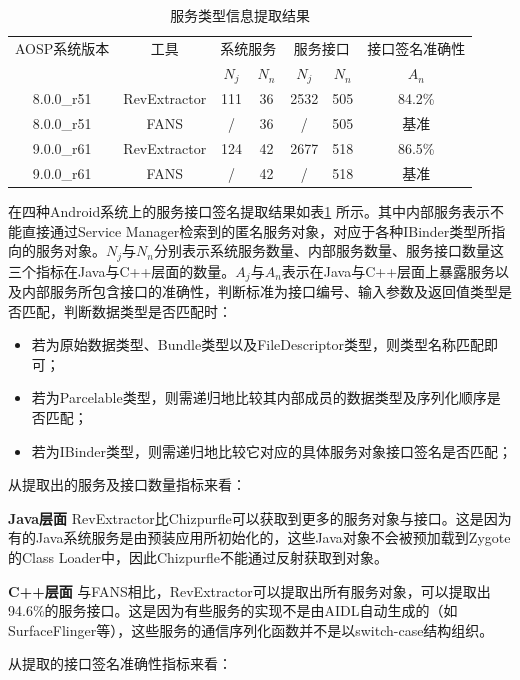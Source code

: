 \documentclass[winfonts,master,twoside]{njuthesis}
\begin{document}
\begin{table}[!htbp]
	\centering
	\begin{tabular}{ccc|cc|cc}
		\toprule{}
		AOSP系统版本 & 工具 & \multicolumn{2}{c}{系统服务} & \multicolumn{2}{c}{服务接口} & 接口签名准确性 \\
		& & $N_j$ & $N_n$ & $N_j$ & $N_n$ & $A_n$\\
		\midrule
		8.0.0\_r51 & RevExtractor & 111& 36 &2532&505 &84.2\%\\
		8.0.0\_r51 & FANS         & /  & 36 & /  &505 &基准   \\
		9.0.0\_r61 & RevExtractor & 124& 42 &2677&518 &86.5\%\\
		9.0.0\_r61 & FANS         & /  & 42 & /  &518 &基准   \\
		\bottomrule
	\end{tabular}
	\caption{服务类型信息提取结果}
	\label{tbl:extractor_comp}
\end{table}
\fi

在四种Android系统上的服务接口签名提取结果如表\ref{tbl:extractor_comp} 所示。其中内部服务表示不能直接通过Service Manager检索到的匿名服务对象，对应于各种IBinder类型所指向的服务对象。$N_j$与$N_n$分别表示系统服务数量、内部服务数量、服务接口数量这三个指标在Java与C++层面的数量。$A_j$与$A_n$表示在Java与C++层面上暴露服务以及内部服务所包含接口的准确性，判断标准为接口编号、输入参数及返回值类型是否匹配，判断数据类型是否匹配时：
\begin{itemize}
	\item 若为原始数据类型、Bundle类型以及FileDescriptor类型，则类型名称匹配即可；
	\item 若为Parcelable类型，则需递归地比较其内部成员的数据类型及序列化顺序是否匹配；
	\item 若为IBinder类型，则需递归地比较它对应的具体服务对象接口签名是否匹配；
\end{itemize}

从提取出的服务及接口数量指标来看：

\textbf{Java层面} \quad RevExtractor比Chizpurfle可以获取到更多的服务对象与接口。这是因为有的Java系统服务是由预装应用所初始化的，这些Java对象不会被预加载到Zygote的Class Loader中，因此Chizpurfle不能通过反射获取到对象。

\textbf{C++层面} \quad 与FANS相比，RevExtractor可以提取出所有服务对象，可以提取出94.6\%的服务接口。这是因为有些服务的实现不是由AIDL自动生成的（如SurfaceFlinger等），这些服务的通信序列化函数并不是以switch-case结构组织。


从提取的接口签名准确性指标来看：
\end{document}
